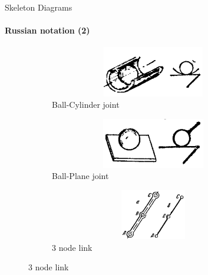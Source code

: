 \documentclass[aspectratio=169]{beamer}
\begin{document}
\begin{frame}[t]{Skeleton Diagrams}
\framesubtitle{Russian notation (2)}
\vspace{-0.5cm}
\begin{figure}[H]
    \begin{subfigure}{0.32\textwidth}
        \centering\includegraphics[height=2.2cm,width=1\textwidth,keepaspectratio]{B_C_sd.png}
        \caption*{Ball-Cylinder joint}
    \end{subfigure}
    \begin{subfigure}{0.32\textwidth}
        \centering\includegraphics[height=2.2cm,width=1\textwidth,keepaspectratio]{B_F_sd.png}
        \caption*{Ball-Plane joint}
    \end{subfigure}
    \begin{subfigure}{0.32\textwidth}
        \centering\includegraphics[height=2.2cm,width=1\textwidth,keepaspectratio]{3l_sd.png}
        \caption*{3 node link}
    \end{subfigure}



\end{figure}
\end{frame}
\end{document}
